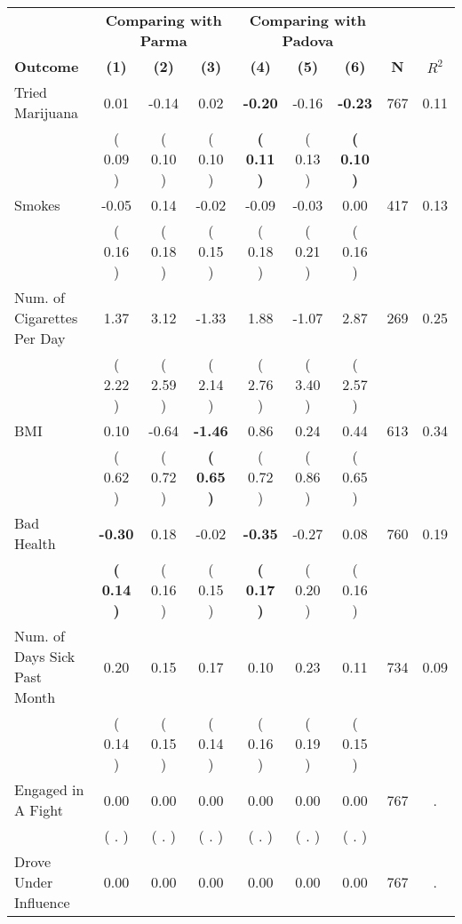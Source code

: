\begin{tabular}{lcccccccc}
\toprule
 & \multicolumn{3}{c}{\textbf{Comparing with Parma}} & \multicolumn{3}{c}{\textbf{Comparing with Padova}} & \\
\cmidrule(lr){2-4} \cmidrule(lr){5-7} 
 \textbf{Outcome} & \textbf{(1)} & \textbf{(2)} & \textbf{(3)} & \textbf{(4)} & \textbf{(5)} & \textbf{(6)} & \textbf{N} & \textbf{$ R^2$} \\
\midrule
Tried Marijuana &      0.01 &     -0.14 &      0.02 & \textbf{    -0.20} &     -0.16 & \textbf{    -0.23} & 767 &       0.11 \\ 
 & (     0.09 ) & (     0.10 ) & (     0.10 ) & \textbf{(     0.11 )} & (     0.13 ) & \textbf{(     0.10 )} & \\
Smokes &     -0.05 &      0.14 &     -0.02 &     -0.09 &     -0.03 &      0.00 & 417 &       0.13 \\ 
 & (     0.16 ) & (     0.18 ) & (     0.15 ) & (     0.18 ) & (     0.21 ) & (     0.16 ) & \\
Num. of Cigarettes Per Day &      1.37 &      3.12 &     -1.33 &      1.88 &     -1.07 &      2.87 & 269 &       0.25 \\ 
 & (     2.22 ) & (     2.59 ) & (     2.14 ) & (     2.76 ) & (     3.40 ) & (     2.57 ) & \\
BMI &      0.10 &     -0.64 & \textbf{    -1.46} &      0.86 &      0.24 &      0.44 & 613 &       0.34 \\ 
 & (     0.62 ) & (     0.72 ) & \textbf{(     0.65 )} & (     0.72 ) & (     0.86 ) & (     0.65 ) & \\
Bad Health & \textbf{    -0.30} &      0.18 &     -0.02 & \textbf{    -0.35} &     -0.27 &      0.08 & 760 &       0.19 \\ 
 & \textbf{(     0.14 )} & (     0.16 ) & (     0.15 ) & \textbf{(     0.17 )} & (     0.20 ) & (     0.16 ) & \\
Num. of Days Sick Past Month &      0.20 &      0.15 &      0.17 &      0.10 &      0.23 &      0.11 & 734 &       0.09 \\ 
 & (     0.14 ) & (     0.15 ) & (     0.14 ) & (     0.16 ) & (     0.19 ) & (     0.15 ) & \\
Engaged in A Fight &      0.00 &      0.00 &      0.00 &      0.00 &      0.00 &      0.00 & 767 &          . \\ 
 & (        . ) & (        . ) & (        . ) & (        . ) & (        . ) & (        . ) & \\
Drove Under Influence &      0.00 &      0.00 &      0.00 &      0.00 &      0.00 &      0.00 & 767 &          . \\ 

\end{tabular}

